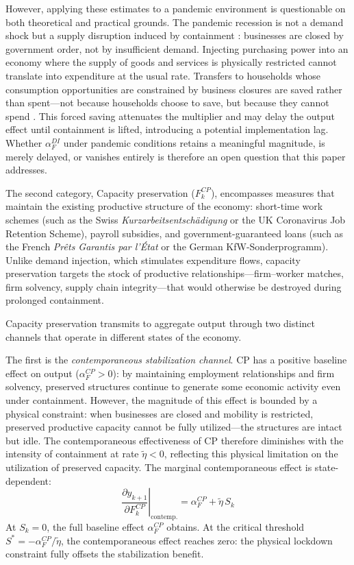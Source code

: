 \documentclass[12pt, a4paper]{article}
\begin{document}
However, applying these estimates to a pandemic environment is 
questionable on both theoretical and practical grounds. The pandemic  recession is not a demand shock but a supply disruption induced by containment \citep{guerrieri2022}: businesses are closed by government order, not by insufficient demand. Injecting purchasing power into an economy where the supply of goods and services is physically restricted cannot translate into expenditure at the usual rate. Transfers to households whose consumption opportunities are constrained by business closures are saved rather than spent---not because households choose to save, but because they cannot spend \citep{chetty2020, coibion2020}. This forced saving attenuates the multiplier and may delay the output effect until containment is lifted, introducing a potential implementation lag. Whether $\alpha^{DI}_F$ under pandemic conditions retains a meaningful magnitude, is merely delayed, or vanishes entirely is therefore an open question that this paper addresses.

The second category, Capacity preservation ($F^{CP}_k$), encompasses measures that maintain the existing productive structure of the economy: short-time work schemes (such as the Swiss \textit{Kurzarbeitsentschädigung} or the UK Coronavirus Job Retention Scheme), payroll subsidies, and government-guaranteed loans (such as the French \textit{Pr\^ets Garantis par l'\'{E}tat} or the German KfW-Sonderprogramm). Unlike demand injection, which stimulates expenditure flows, capacity preservation targets the stock of productive relationships---firm--worker matches, firm solvency, supply chain integrity---that would otherwise be destroyed during prolonged containment.

Capacity preservation transmits to aggregate output through two distinct channels that operate in different states of the economy.

The first is the \textit{contemporaneous stabilization channel}. CP has a positive baseline effect on output ($\alpha^{CP}_F > 0$): by maintaining employment relationships and firm solvency, preserved structures continue to generate some economic activity even under containment. However, the magnitude of this effect is bounded by a physical constraint: when businesses are closed and mobility is restricted, preserved productive capacity cannot be fully utilized---the structures are intact but idle. The contemporaneous effectiveness of CP therefore diminishes with the intensity of containment at rate $\tilde{\eta} < 0$, reflecting this physical limitation on the utilization of preserved capacity. The marginal contemporaneous effect is state-dependent:
%
\begin{equation}
    \left.\frac{\partial y_{k+1}}{\partial F^{CP}_k}\right|_{\text{contemp.}} = \alpha^{CP}_F + \tilde{\eta}\, S_k
    \label{eq:cp_contemp}
\end{equation}
%
At $S_k = 0$, the full baseline effect $\alpha^{CP}_F$ obtains. At the critical threshold $S^* = -\alpha^{CP}_F / \tilde{\eta}$, the contemporaneous effect reaches zero: the physical lockdown constraint fully offsets the stabilization benefit. 
\end{document}
